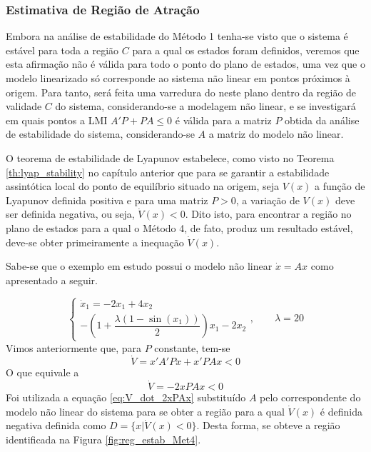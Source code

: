 \subsubsection*{Estimativa de Região de Atração}

Embora na análise de estabilidade do Método 1 tenha-se visto que o sistema é estável para toda a região $C$ para a qual os estados foram definidos, veremos que esta afirmação não é válida para todo o ponto do plano de estados, uma vez que o modelo linearizado só corresponde ao sistema não linear em pontos próximos à origem. Para tanto, será feita uma varredura do neste plano dentro da região de validade $C$ do sistema, considerando-se a modelagem não linear, e se  investigará em quais pontos a LMI $A'P + PA \leq 0$ é válida para a matriz $P$ obtida da análise de estabilidade do sistema, considerando-se $A$ a matriz do modelo não linear.

O teorema de estabilidade de Lyapunov estabelece, como visto no Teorema \ref{th:lyap_stability} no capítulo anterior que para se garantir a estabilidade assintótica local do ponto de equilíbrio situado na origem, seja $V(x)$ a função de Lyapunov definida positiva e para uma matriz $P > 0$, a variação de $V(x)$ deve ser definida negativa, ou seja, $\dot{V}(x) < 0$. Dito isto, para encontrar a região no plano de estados para a qual o Método 4, de fato, produz um resultado estável, deve-se obter primeiramente a inequação $\dot{V}(x)$.

Sabe-se que o exemplo em estudo possui o modelo não linear $\dot{x} = Ax$ como apresentado a seguir.

\begin{equation}\label{eq:ex2_LPJ12_non_linear_again_again}
\begin{cases}\dot{x}_1 = -2x_1 + 4x_2
\\-(1 + \dfrac{\lambda(1 - \sin(x_1))}{2})x_1 - 2x_2\end{cases},\qquad \lambda = 20
\end{equation}
Vimos anteriormente que, para $P$ constante, tem-se
\begin{equation*}
\dot{V} = x'A'Px +x'PAx < 0
\end{equation*}
O que equivale a
\begin{equation}\label{eq:V_dot_2xPAx}
\dot{V} = -2xPAx < 0
\end{equation}
Foi utilizada a equação \ref{eq:V_dot_2xPAx} substituído $A$ pelo correspondente do modelo não linear do sistema para se obter a região para a qual $\dot{V}(x)$ é definida negativa definida como $D = \{x | \dot{V}(x) < 0\}$. Desta forma, se obteve a região identificada na Figura \ref{fig:reg_estab_Met4}.

